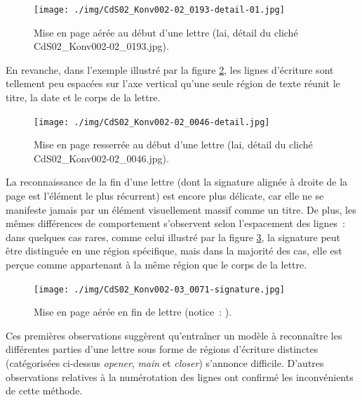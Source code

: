 \documentclass[a4paper,12pt,twoside]{book}
\begin{document}
				\begin{figure}[!h]
					\centering
					\texttt{[image: ./img/CdS02\_Konv002-02\_0193-detail-01.jpg]}%
					\caption{Mise en page aérée au début d'une lettre (\gls{lai}, détail du cliché CdS02\_Konv002-02\_0193.jpg).}%
					\label{seg-opener-193}
				\end{figure}
			
				En revanche, dans l'exemple illustré par la figure \ref{seg-glob-46}, les lignes d'écriture sont tellement peu espacées sur l'axe vertical qu'une seule région de texte réunit le titre, la date et le corps de la lettre.
			
				\begin{figure}[!h]
					\centering
					\texttt{[image: ./img/CdS02\_Konv002-02\_0046-detail.jpg]}%
					\caption{Mise en page resserrée au début d'une lettre (\gls{lai}, détail du cliché CdS02\_Konv002-02\_0046.jpg).}%
					\label{seg-glob-46}%
				\end{figure}
				
				La reconnaissance de la fin d'une lettre (dont la signature alignée à droite de la page est l'élément le plus récurrent) est encore plus délicate, car elle ne se manifeste jamais par un élément visuellement massif comme un titre. De plus, les mêmes différences de comportement s'observent selon l'espacement des lignes~: dans quelques cas rares, comme celui illustré par la figure \ref{seg-signaure-71}, la signature peut être distinguée en une région spécifique, mais dans la majorité des cas, elle est perçue comme appartenant à la même région que le corps de la lettre.
				
				\begin{figure}[!h]
					\centering
					\texttt{[image: ./img/CdS02\_Konv002-03\_0071-signature.jpg]}%
					\caption{Mise en page aérée en fin de lettre (notice~: \cite{CdS02070071}).}%
					\label{seg-signaure-71}%
				\end{figure}
				
				Ces premières observations suggèrent qu'entraîner un modèle à reconnaître les différentes parties d'une lettre sous forme de régions d'écriture distinctes (catégorisées ci-dessus \textit{opener}, \textit{main} et \textit{closer}) s'annonce difficile. D'autres observations relatives à la numérotation des lignes ont confirmé les inconvénients de cette méthode.
				
\end{document}
